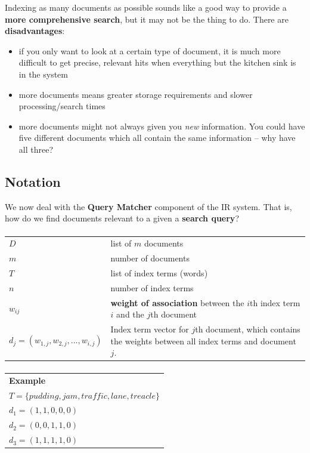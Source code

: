 \documentclass{article}
\begin{document}
Indexing as many documents as possible sounds like a good way to provide a \textbf{more comprehensive search}, but it may not be the thing to do.  There are \textbf{disadvantages}:
\begin{itemize}
	\item if you only want to look at a certain type of document, it is much more difficult to get precise, relevant hits when everything but the kitchen sink is in the system
	\item more documents means greater storage requirements and slower processing/search times
	\item more documents might not always given you \textit{new} information. You could have five different documents which all contain the same information -- why have all three?
\end{itemize}

\subsection{Notation}

We now deal with the \textbf{Query Matcher} component of the IR system. That is, how do we find documents relevant to a given a \textbf{search query}?

\paragraph{}

\begin{tabular}{p{4cm}p{12cm}}
	$D$ & list of $m$ documents \\
	$m$ & number of documents \\
	$T$ & list of index terms (words) \\
	$n$ & number of index terms \\
	$w_{ij}$ & \textbf{weight of association} between the $i$th index term $i$ and the $j$th document \\
	$d_j = (w_{1,j}, w_{2,j}, ..., w_{i,j})$ & Index term vector for $j$th document, which contains the weights between all index terms and document $j$.
\end{tabular}

\paragraph{}

\begin{tabular}{p{16cm}}
	\textbf{Example} \\
	$T = \lbrace pudding, jam, traffic, lane, treacle \rbrace$ \\
	$d_1 = (1, 1, 0, 0, 0)$ \\
	$d_2 = (0, 0, 1, 1, 0)$ \\
	$d_3 = (1, 1, 1, 1, 0)$ \\
\end{tabular}
\end{document}
